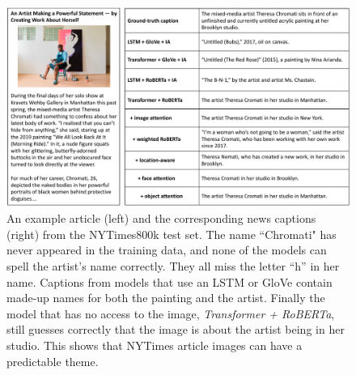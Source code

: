 \documentclass[10pt,twocolumn,letterpaper]{article}
\begin{document}
\clearpage


\begin{figure}[p]
   \begin{center}
      \includegraphics[width=\linewidth]{figures/chromati.pdf}
   \end{center}
   \caption{An example article (left) and the corresponding news captions
      (right) from the NYTimes800k test set. The name ``Chromati" has never
      appeared in the training data, and none of the models can spell the
      artist's name correctly. They all miss the letter ``h'' in her name.
      Captions from models that use an LSTM or GloVe contain made-up names for
      both the painting and the artist. Finally the model that has no access to
      the image, \textit{Transformer + RoBERTa}, still guesses correctly that
      the image is about the artist being in her studio. This shows that
      NYTimes article images can have a predictable theme.}
   \label{fig:chromati}
\end{figure}
\end{document}
